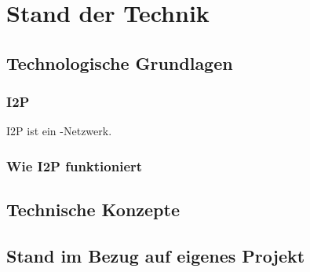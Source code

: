 \chapter{Stand der Technik}
\label{ch:StandDerTechnik}



\section{Technologische Grundlagen}

\subsection{I2P}

I2P ist ein -Netzwerk.


\cite{astolfi_i2p_2015}

\subsection{Wie I2P funktioniert}

\section{Technische Konzepte}
\label{sec:technischeKonzepte}

\section{Stand im Bezug auf eigenes Projekt}
